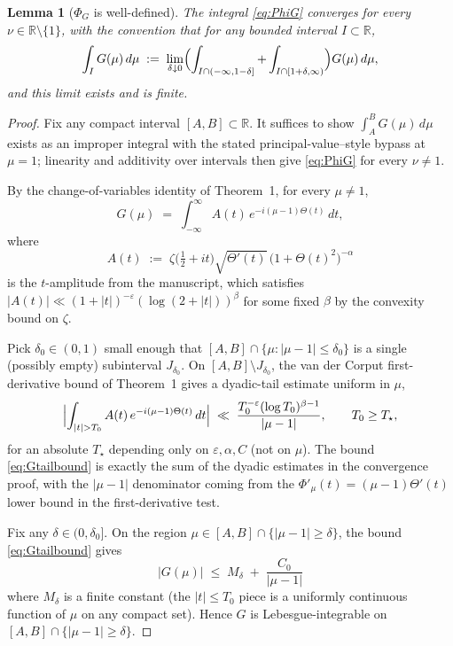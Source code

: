 \documentclass[11pt]{article}
\newtheorem{lemma}[theorem]{Lemma}
\begin{document}
\begin{lemma}[$\Phi_G$ is well-defined]\label{lem:PhiGwelldef}
The integral \eqref{eq:PhiG} converges for every $\nu\in\mathbb R\setminus\{1\}$, with the convention that for any bounded interval $I\subset\mathbb R$,
\[
\int_I G(\mu)\,d\mu \;:=\; \lim_{\delta\downarrow 0}\Bigl(\int_{I\cap(-\infty,1-\delta]}+\int_{I\cap[1+\delta,\infty)}\Bigr)G(\mu)\,d\mu,
\]
and this limit exists and is finite.
\end{lemma}

\begin{proof}
Fix any compact interval $[A,B]\subset\mathbb R$. It suffices to show $\int_A^B G(\mu)\,d\mu$ exists as an improper integral with the stated principal-value--style bypass at $\mu=1$; linearity and additivity over intervals then give \eqref{eq:PhiG} for every $\nu\ne 1$.

By the change-of-variables identity of Theorem~1, for every $\mu\ne 1$,
\[
G(\mu) \;=\; \int_{-\infty}^{\infty} A(t)\,e^{-i(\mu-1)\Theta(t)}\,dt,
\]
where
\begin{equation}\label{eq:A}
A(t) \;:=\; \zeta\!\bigl(\tfrac12+it\bigr)\sqrt{\Theta'(t)}\,\bigl(1+\Theta(t)^2\bigr)^{-\alpha}
\end{equation}
is the $t$-amplitude from the manuscript, which satisfies $|A(t)|\ll (1+|t|)^{-\varepsilon}(\log(2+|t|))^\beta$ for some fixed $\beta$ by the convexity bound on $\zeta$.

Pick $\delta_0\in(0,1)$ small enough that $[A,B]\cap\{\mu:|\mu-1|\le\delta_0\}$ is a single (possibly empty) subinterval $J_{\delta_0}$. On $[A,B]\setminus J_{\delta_0}$, the van der Corput first-derivative bound of Theorem~1 gives a dyadic-tail estimate uniform in $\mu$,
\begin{equation}\label{eq:Gtailbound}
\Bigl|\int_{|t|>T_0}A(t)\,e^{-i(\mu-1)\Theta(t)}\,dt\Bigr| \;\ll\; \frac{T_0^{-\varepsilon}(\log T_0)^{\beta-1}}{|\mu-1|},\qquad T_0\ge T_\star,
\end{equation}
for an absolute $T_\star$ depending only on $\varepsilon,\alpha,C$ (not on $\mu$). The bound \eqref{eq:Gtailbound} is exactly the sum of the dyadic estimates in the convergence proof, with the $|\mu-1|$ denominator coming from the $\Phi'_\mu(t)=(\mu-1)\Theta'(t)$ lower bound in the first-derivative test.

Fix any $\delta\in(0,\delta_0]$. On the region $\mu\in[A,B]\cap\{|\mu-1|\ge\delta\}$, the bound \eqref{eq:Gtailbound} gives
\[
|G(\mu)| \;\le\; M_\delta \;+\; \frac{C_0}{|\mu-1|}
\]
where $M_\delta$ is a finite constant (the $|t|\le T_0$ piece is a uniformly continuous function of $\mu$ on any compact set). Hence $G$ is Lebesgue-integrable on $[A,B]\cap\{|\mu-1|\ge\delta\}$.


\end{proof}
\end{document}
